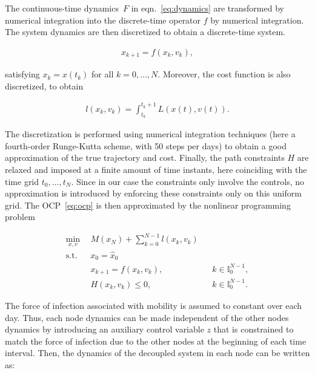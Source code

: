 The continuous-time dynamics~$F$ in eqn.~\eqref{eq:dynamics} are transformed by numerical integration into the discrete-time operator $f$ by numerical integration. The system dynamics are then discretized to obtain a discrete-time system.

\begin{align*}
    x_{k+1} = f(x_k,v_k),
\end{align*}

satisfying $x_k=x(t_k)$ for all $k=0,\ldots,N$. Moreover, the cost function is also discretized, to obtain

\begin{align*}
    l(x_k,v_k)=\int_{t_k}^{t_k+1} L(x(t),v(t)).
\end{align*}

The discretization is performed using numerical integration techniques (here a fourth-order Runge-Kutta scheme, with 50 steps per days) to obtain a good approximation of the true trajectory and cost. Finally, the path constraints $H$ are relaxed and imposed at a finite amount of time instants, here coinciding with the time grid $t_0,\ldots,t_N$. Since in our case the constraints only involve the controls, no approximation is introduced by enforcing these constraints only on this uniform grid. The OCP~\eqref{eq:ocp} is then approximated by the nonlinear programming problem

\begin{subequations}
    \begin{align}
        \min_{x,v} \ \ & M(x_N)+\sum_{k=0}^{N-1} l(x_k,v_k)  \\ 
        \mathrm{s.t.} \ \ & x_0 = \hat x_0 \\
        & x_{k+1} = f(x_k,v_k), && k\in \mathbb{I}_0^{N-1}, \\
        &H(x_k,v_k)\leq 0, && k\in \mathbb{I}_0^{N-1}.
    \end{align}
        \label{eq:ocp_nlp}
\end{subequations}

The force of infection associated with mobility is assumed to constant over each day. Thus, each node dynamics can be made independent of the other nodes dynamics by introducing an auxiliary control variable $z$ that is constrained to match the force of infection due to the other nodes at the beginning of each time interval. Then, the dynamics of the decoupled system in each node can be written as:

